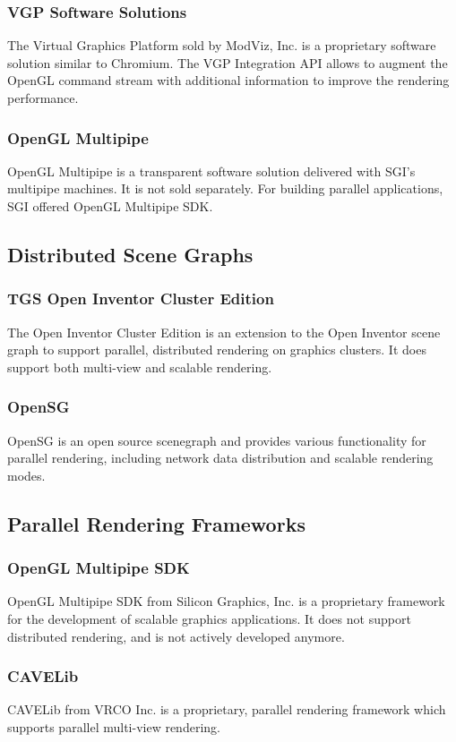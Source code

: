 \documentclass[10pt,a4paper]{scrartcl}
\begin{document}
\subsubsection{VGP Software Solutions}
The Virtual Graphics Platform sold by ModViz, Inc. is a proprietary
software solution similar to Chromium. The VGP Integration API allows to
augment the OpenGL command stream with additional information to improve
the rendering performance.

\subsubsection{OpenGL Multipipe}
OpenGL Multipipe is a transparent software solution delivered with SGI's
multipipe machines. It is not sold separately. For building parallel
applications, SGI offered OpenGL Multipipe SDK.

\subsection{Distributed Scene Graphs}
\subsubsection{TGS Open Inventor Cluster Edition}
The Open Inventor Cluster Edition is an extension to the Open Inventor
scene graph to support parallel, distributed rendering on graphics
clusters. It does support both multi-view and scalable rendering.

\subsubsection{OpenSG}
OpenSG is an open source scenegraph and provides various functionality
for parallel rendering, including network data distribution and scalable
rendering modes.

\subsection{Parallel Rendering Frameworks}
\subsubsection{OpenGL Multipipe SDK}
OpenGL Multipipe SDK from Silicon Graphics, Inc. is a proprietary
framework for the development of scalable graphics applications. It does
not support distributed rendering, and is not actively developed anymore.

\subsubsection{CAVELib}
CAVELib from VRCO Inc. is a proprietary, parallel rendering framework
which supports parallel multi-view rendering.
\end{document}
